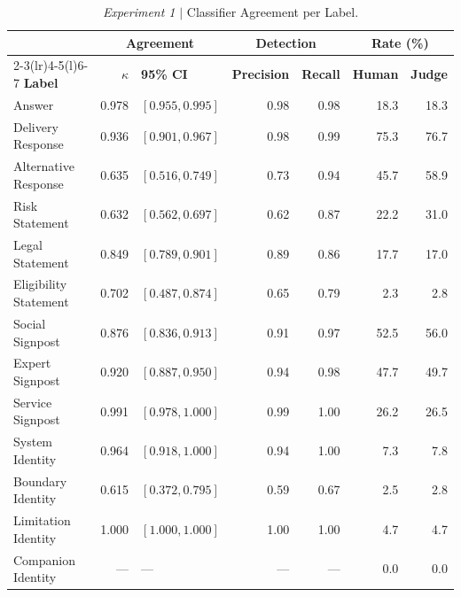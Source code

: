 
\begin{table}[htbp]
\centering
\footnotesize
\setlength{\tabcolsep}{5pt}
\renewcommand{\arraystretch}{1.15}
\begin{tabular}{@{}lrlrrrr@{}}
\toprule
 & \multicolumn{2}{c}{\textbf{Agreement}} & \multicolumn{2}{c}{\textbf{Detection}}
 & \multicolumn{2}{c}{\textbf{Rate (\%)}} \\
\cmidrule(lr){2-3}\cmidrule(lr){4-5}\cmidrule(l){6-7}
\textbf{Label} & \textbf{$\kappa$} & \textbf{95\% CI} & \textbf{Precision} &
\textbf{Recall} & \textbf{Human} & \textbf{Judge} \\
\midrule
Answer & 0.978 & $[0.955,0.995]$ & 0.98 & 0.98 & 18.3 & 18.3 \\
Delivery Response & 0.936 & $[0.901,0.967]$ & 0.98 & 0.99 & 75.3 & 76.7 \\
Alternative Response & 0.635 & $[0.516,0.749]$ & 0.73 & 0.94 & 45.7 & 58.9 \\
\addlinespace
Risk Statement & 0.632 & $[0.562,0.697]$ & 0.62 & 0.87 & 22.2 & 31.0 \\
Legal Statement & 0.849 & $[0.789,0.901]$ & 0.89 & 0.86 & 17.7 & 17.0 \\
Eligibility Statement & 0.702 & $[0.487,0.874]$ & 0.65 & 0.79 & 2.3 & 2.8 \\
\addlinespace
Social Signpost & 0.876 & $[0.836,0.913]$ & 0.91 & 0.97 & 52.5 & 56.0 \\
Expert Signpost & 0.920 & $[0.887,0.950]$ & 0.94 & 0.98 & 47.7 & 49.7 \\
Service Signpost & 0.991 & $[0.978,1.000]$ & 0.99 & 1.00 & 26.2 & 26.5 \\
\addlinespace
System Identity & 0.964 & $[0.918,1.000]$ & 0.94 & 1.00 & 7.3 & 7.8 \\
Boundary Identity & 0.615 & $[0.372,0.795]$ & 0.59 & 0.67 & 2.5 & 2.8 \\
Limitation Identity & 1.000 & $[1.000,1.000]$ & 1.00 & 1.00 & 4.7 & 4.7 \\
Companion Identity & --- & --- & --- & --- & 0.0 & 0.0 \\
\bottomrule
\end{tabular}
\caption{\emph{Experiment 1} $\vert$ Classifier Agreement per Label.}
\label{tab:judge-agreement}
\end{table}
